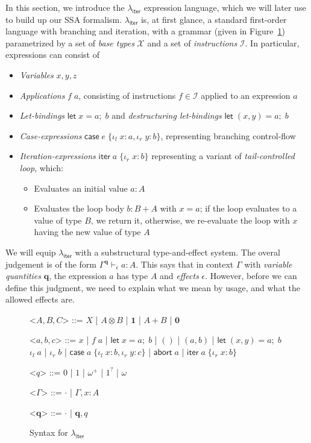 \documentclass[acmsmall,screen,review]{acmart}
\newcommand{\mc}[1]{\ensuremath{\mathcal{#1}}}
\newcommand{\mb}[1]{\ensuremath{\mathbf{#1}}}
\newcommand{\ms}[1]{\ensuremath{\mathsf{#1}}}
\newcommand{\lto}{:}
\newcommand{\linl}[1]{\iota_l\;{#1}}
\newcommand{\linr}[1]{\iota_r\;{#1}}
\newcommand{\labort}[1]{\ms{abort}\;{#1}}
\newcommand{\letexpr}[3]{\ensuremath{\ms{let}\;#1 = #2;\;#3}}
\newcommand{\caseexpr}[5]{\ms{case}\;#1\;\{\linl{#2} \lto #3, \linr{#4} \lto #5\}}
\newcommand{\liter}[3]{\ms{iter}\;#1\;\{ \linr{#2} \lto #3 \}}
\newcommand{\hasty}[4]{#1 \vdash_{#2} #3: {#4}}
\newcommand{\subiterssa}{\(\lambda_{\ms{iter}}\)}
\newcommand{\zeroq}{0}
\newcommand{\oneq}{1}
\newcommand{\delq}{1^?}
\newcommand{\cpyq}{\omega^+}
\newcommand{\topq}{\omega}
\begin{document}
In this section, we introduce the \subiterssa{} expression language, which we will later use to
build up our SSA formalism. \subiterssa{} is, at first glance, a standard first-order language with
branching and iteration, with a grammar (given in Figure~\ref{fig:subiterssa-syntax})  parametrized
by a set of \emph{base types} $\mc{X}$ and a set of \emph{instructions} $\mc{I}$. In particular,
expressions can consist of
\begin{itemize}
  \item \emph{Variables} $x, y, z$
  \item \emph{Applications} $f\;a$, consisting of instructions $f \in \mc{I}$ applied to an
  expression $a$
  \item \emph{Let-bindings} $\letexpr{x}{a}{b}$ and \emph{destructuring let-bindings} $\letexpr{(x,
  y)}{a}{b}$
  \item \emph{Case-expressions} $\caseexpr{e}{x}{a}{y}{b}$, representing branching control-flow
  \item \emph{Iteration-expressions} $\liter{a}{x}{b}$ representing a variant of
  \emph{tail-controlled loop}, which:
  \begin{itemize}
    \item Evaluates an initial value $a : A$
    \item Evaluates the loop body $b : B + A$ with $x = a$; if the loop evaluates to a value of type
    $B$, we return it, otherwise, we re-evaluate the loop with $x$ having the new value of type $A$
  \end{itemize}
\end{itemize}


We will equip \subiterssa{} with a substructural type-and-effect system.
The overal judgement is of the form $\hasty{\Gamma^{\mb{q}}}{\epsilon}{a}{A}$. This says that in context $\Gamma$ with \emph{variable quantities} $\mb{q}$, the expression $a$ has type $A$ and \emph{effects} $\epsilon$. However, before we can define this judgment, we need to explain what we mean by usage, and what the allowed effects are. 

\begin{figure}
  \begin{grammar}
    <\(A, B, C\)> ::= 
    \(X\)
    \;|\; \(A \otimes B\)
    \;|\; \(\mathbf{1}\)
    \;|\; \(A + B\)
    \;|\; \(\mathbf{0}\)

    <\(a, b, c\)> ::=
    \(x\)
    \;|\; \(f\;a\)
    \;|\; \(\letexpr{x}{a}{b}\)
    \;|\; \(()\)
    \;|\; \((a, b)\)
    \;|\; \(\letexpr{(x, y)}{a}{b}\)
    \alt  \(\linl{a}\)
    \;|\; \(\linr{b}\)
    \;|\; \(\caseexpr{a}{x}{b}{y}{c}\)
    \;|\; \(\labort{a}\)
    \;|\; \(\liter{a}{x}{b}\)
    
    <\(q\)> ::= \(\zeroq\) | \(\oneq\) | \(\cpyq\) | \(\delq\) | \(\topq\)

    <\(\Gamma\)> ::= \(\cdot\) \;|\; \(\Gamma, x : A\)

    <\(\mb{q}\)> ::= \(\cdot\) \;|\; \(\mb{q}, q\)
  \end{grammar}
  \caption{Syntax for \subiterssa}
  \label{fig:subiterssa-syntax}
\end{figure}
\end{document}
